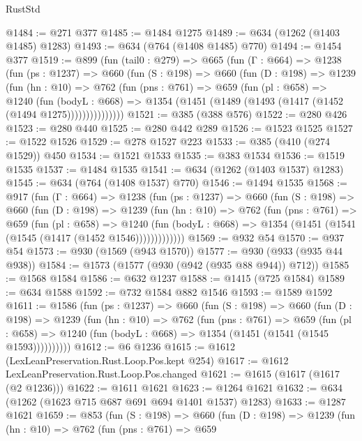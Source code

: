 \begin{lexlean}{RustStd}
\begin{coremodule}
@1484 := @271 @377
@1485 := @1484 @1275
@1489 := @634 (@1262 (@1403 @1485) @1283)
@1493 := @634 (@764 (@1408 @1485) @770)
@1494 := @1454 @377
@1519 := @899
    (fun (tail0 : @279) =>
    @665
      (fun (Γ : @664) =>
      @1238
        (fun (ps : @1237) =>
        @660
          (fun (S : @198) =>
          @660
            (fun (D : @198) =>
            @1239
              (fun (hn : @10) =>
              @762
                (fun (pns : @761) =>
                @659
                  (fun (pl : @658) =>
                  @1240
                    (fun (bodyL : @668) =>
                    @1354 (@1451 (@1489 (@1493 (@1417 (@1452 (@1494 @1275)))))))))))))))
@1521 := @385 (@388 @576)
@1522 := @280 @426
@1523 := @280 @440
@1525 := @280 @442 @289
@1526 := @1523 @1525
@1527 := @1522 @1526
@1529 := @278 @1527 @223
@1533 := @385 (@410 (@274 @1529)) @450
@1534 := @1521 @1533
@1535 := @383 @1534
@1536 := @1519 @1535
@1537 := @1484 @1535
@1541 := @634 (@1262 (@1403 @1537) @1283)
@1545 := @634 (@764 (@1408 @1537) @770)
@1546 := @1494 @1535
@1568 := @917
    (fun (Γ : @664) =>
    @1238
      (fun (ps : @1237) =>
      @660
        (fun (S : @198) =>
        @660
          (fun (D : @198) =>
          @1239
            (fun (hn : @10) =>
            @762
              (fun (pns : @761) =>
              @659
                (fun (pl : @658) =>
                @1240
                  (fun (bodyL : @668) => @1354 (@1451 (@1541 (@1545 (@1417 (@1452 @1546)))))))))))))
@1569 := @932 @54
@1570 := @937 @54
@1573 := @930 (@1569 (@943 @1570))
@1577 := @930 (@933 (@935 @44 @938))
@1584 := @1573 (@1577 (@930 (@942 (@935 @88 @944)) @712))
@1585 := @1568 @1584
@1586 := @632 @1237
@1588 := @1415 (@725 @1584)
@1589 := @634 @1588
@1592 := @732 @1584 @882 @1546
@1593 := @1589 @1592
@1611 := @1586
    (fun (ps : @1237) =>
    @660
      (fun (S : @198) =>
      @660
        (fun (D : @198) =>
        @1239
          (fun (hn : @10) =>
          @762
            (fun (pns : @761) =>
            @659
              (fun (pl : @658) =>
              @1240 (fun (bodyL : @668) => @1354 (@1451 (@1541 (@1545 @1593))))))))))
@1612 := @6 @1236
@1615 := @1612 (LexLeanPreservation.Rust.Loop.Pos.kept @254)
@1617 := @1612 LexLeanPreservation.Rust.Loop.Pos.changed
@1621 := @1615 (@1617 (@1617 (@2 @1236)))
@1622 := @1611 @1621
@1623 := @1264 @1621
@1632 := @634 (@1262 (@1623 @715 @687 @691 @694 @1401 @1537) @1283)
@1633 := @1287 @1621
@1659 := @853
    (fun (S : @198) =>
    @660
      (fun (D : @198) =>
      @1239
        (fun (hn : @10) =>
        @762
          (fun (pns : @761) =>
          @659

\end{coremodule}
\end{lexlean}
